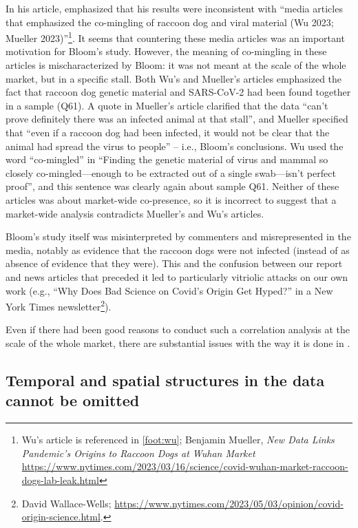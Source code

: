 \documentclass[11pt]{article}
\def \sct {\mbox{SARS-CoV-2}}
\begin{document}
In his article, \citet{Bloom2023VE} emphasized that his results were inconsistent with ``media articles that emphasized the co-mingling of raccoon dog and viral material (Wu 2023; Mueller 2023)''\footnote{Wu's article is referenced in \cref{foot:wu}; Benjamin Mueller, \textit{New Data Links Pandemic’s Origins to Raccoon Dogs at Wuhan Market} \url{https://www.nytimes.com/2023/03/16/science/covid-wuhan-market-raccoon-dogs-lab-leak.html}}. It seems that countering these media articles was an important motivation for Bloom's study. However, the meaning of co-mingling in these articles is mischaracterized by Bloom: it was not meant at the scale of the whole market, but in a specific stall. Both Wu's and Mueller's articles emphasized the fact that raccoon dog genetic material and \sct{} had been found together in a sample (Q61). A quote in Mueller's article clarified that the data ``can't prove definitely there was an infected animal at that stall'', and Mueller specified that ``even if a raccoon dog had been infected, it would not be clear that the animal had spread the virus to people'' -- i.e., Bloom's conclusions. Wu used the word ``co-mingled'' in ``Finding the genetic material of virus and mammal so closely co-mingled—enough to be extracted out of a single swab—isn't perfect proof'', and this sentence was clearly again about sample Q61. Neither of these articles was about market-wide co-presence, so it is incorrect to suggest that a market-wide analysis contradicts Mueller's and Wu's articles. 

Bloom's study itself was misinterpreted by commenters and misrepresented in the media, notably as evidence that the raccoon dogs were not infected (instead of as absence of evidence that they were). This and the confusion between our report and news articles that preceded it led to particularly vitriolic attacks on our own work (e.g., ``Why Does Bad Science on Covid’s Origin Get Hyped?'' in a New York Times newsletter\footnote{David Wallace-Wells; \url{https://www.nytimes.com/2023/05/03/opinion/covid-origin-science.html}.}). 

Even if there had been good reasons to conduct such a correlation analysis at the scale of the whole market, there are substantial issues with the way it is done in \citet{Bloom2023VE}.

\subsection{Temporal and spatial structures in the data cannot be omitted}
\end{document}
